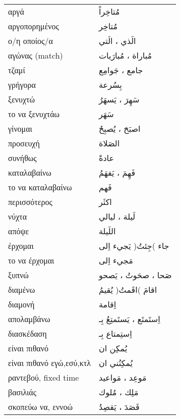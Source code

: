 \documentclass[twocolumn,a4paper]{article}
\newcommand{\ar}[1]{\textarabic{#1}}
\newcommand{\prth}[1]{\textenglish{)}#1\textenglish{(}}
\newcommand{\pl}{\raisebox{0.15ex}{\footnotesize ◍}}
\newcommand{\vrf}{\raisebox{0.15ex}{\footnotesize ◉}}
\newcommand{\mas}{\raisebox{0.15ex}{\footnotesize ◫}}
\begin{document}
\begin{mpsupertabular}{ P{0.5\textwidth} P{0.5\textwidth} }
αργά                         & \ar{ مُتاخِراً } \\
αργοπορημένος                & \ar{ مُتاخِر } \\
ο/η οποίος/α                 & \ar{ الَذي ، الَتي } \\
αγώνας (match) \pl           & \ar{ مُباراة ، مُبارَيات } \\
τζαμί \pl                    & \ar{ جامع ، جَوامِع } \\
γρήγορα                      & \ar{ بِسُرعة } \\
ξενυχτώ \vrf                 & \ar{ سَهِرَ ، يَسهَرُ } \\
το να ξενυχτάω \mas          & \ar{ سَهَر } \\
γίνομαι \vrf                 & \ar{ اصبَحَ ، يُصبِحُ } \\
προσευχή                     & \ar{ الصَلاة } \\
συνήθως                      & \ar{ عادةً } \\
καταλαβαίνω \vrf             & \ar{ فَهِمَ ، يَفهَمُ } \\
το να καταλαβαίνω \mas       & \ar{ فَهم } \\
περισσότερος                 & \ar{ اكثَر } \\
νύχτα \pl                    & \ar{ لَيلة ، ليالي } \\
απόψε                        & \ar{ اللَيلة } \\
έρχομαι \vrf                 & \ar{ جاء \prth{جِئتُ} يَجيء اِلى } \\
το να έρχομαι \mas           & \ar{ مَجيء اِلى } \\
ξυπνώ \vrf                   & \ar{ صَحا ، صحَوتُ ، يَصحو } \\
διαμένω \vrf                 & \ar{ اقامَ \prth{اقَمتُ} يُقيمُ } \\
διαμονή \mas                 & \ar{ اِقامة } \\
απολαμβάνω \vrf              & \ar{ اِستَمتَع ، يَستَمتِعُ بِـ } \\
διασκέδαση \mas              & \ar{ اِستِمتاع بِـ } \\
είναι πιθανό                 & \ar{ يُمكِن ان } \\
είναι πιθανό εγώ,εσύ,κτλ     & \ar{ يُمكِنُني ان } \\
ραντεβού, fixed time \pl     & \ar{ مَوعِد ، مَواعيد } \\
βασιλιάς \pl                 & \ar{ مَلِك ، مُلوك } \\
σκοπεύω να, εννοώ \vrf       & \ar{ قَصَدَ ، يَقصِدُ } \\

\end{mpsupertabular}
\end{document}
